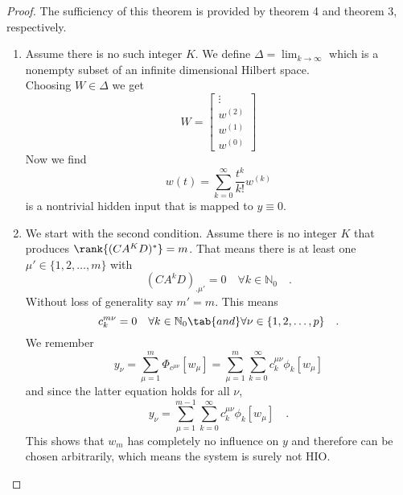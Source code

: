 \begin{proof}
	
	The sufficiency of this theorem is provided by theorem 4 and theorem 3, 
	respectively.
	\begin{enumerate}
	\item Assume there is no such integer $K$. We define $\Delta=\lim_{k\to\infty}$ which 
	is a nonempty subset of an infinite dimensional Hilbert space.\\
	 Choosing $W\in\Delta$ we get
		\begin{equation}
		W = \begin{bmatrix}
		\vdots \\ w^{(2)} \\w^{(1)} \\ w^{(0)}
		\end{bmatrix}
		\end{equation}
		Now we find
		\begin{equation}
		w(t) = \sum\limits_{k=0}^\infty \frac{t^k}{k!} w^{(k)}
		\end{equation}
		is a nontrivial hidden input that is mapped to $y\equiv 0$.
	
	\item We start with the second condition. Assume there is no integer $K$ that produces 
		$\rank{(CA^KD)^*}=m$. That means there is at least one $\mu'\in\{1,2,\ldots,m\}$ 
		with 
		\begin{equation}
		(CA^kD)_{.\mu'} = 0 \quad \forall k\in\mathbb{N}_0 \quad .
		\end{equation}			
		Without loss of generality say $m'=m$. This means 
		\begin{equation}		
		c_k^{m \nu}=0 \quad \forall k\in\mathbb{N}_0 \tab{and} \forall \nu\in\{1,2,
		\ldots,p\} \quad .
		\end{equation}
		We remember
		\begin{equation}
		y_\nu = \sum\limits_{\mu = 1}^m \Phi_{c^{\mu\nu}}[w_\mu] = 
		 \sum\limits_{\mu = 1}^m \sum\limits_{k=0}^\infty c_k^{\mu\nu}\phi_k[w_\mu]
		\end{equation}
		and since the latter equation holds for all $\nu$,
		\begin{equation}
		y_\nu = \sum\limits_{\mu = 1}^{m-1} \sum\limits_{k=0}^\infty c_k^{\mu\nu}\phi_k[w_
		\mu] \quad .
		\end{equation}
		This shows that $w_m$ has completely no influence on $y$ and therefore can be 
		chosen arbitrarily, which means the system is surely not HIO.	 
	\end{enumerate}
\end{proof}

